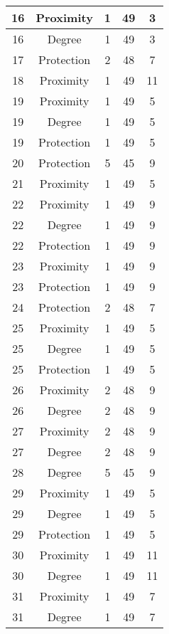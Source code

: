 \documentclass[results.tex]{subfiles}
\begin{document}
\begin{center}
\begin{tabular}{| c || c | c | c | c |}
    \hline
    16 & Proximity & 1 & 49 & 3 \\ 
    \hline
    16 & Degree & 1 & 49 & 3 \\ 
    \hline
    17 & Protection & 2 & 48 & 7 \\ 
    \hline
    18 & Proximity & 1 & 49 & 11 \\ 
    \hline
    19 & Proximity & 1 & 49 & 5 \\ 
    \hline
    19 & Degree & 1 & 49 & 5 \\ 
    \hline
    19 & Protection & 1 & 49 & 5 \\ 
    \hline
    20 & Protection & 5 & 45 & 9 \\ 
    \hline
    21 & Proximity & 1 & 49 & 5 \\ 
    \hline
    22 & Proximity & 1 & 49 & 9 \\ 
    \hline
    22 & Degree & 1 & 49 & 9 \\ 
    \hline
    22 & Protection & 1 & 49 & 9 \\ 
    \hline
    23 & Proximity & 1 & 49 & 9 \\ 
    \hline
    23 & Protection & 1 & 49 & 9 \\ 
    \hline
    24 & Protection & 2 & 48 & 7 \\ 
    \hline
    25 & Proximity & 1 & 49 & 5 \\ 
    \hline
    25 & Degree & 1 & 49 & 5 \\ 
    \hline
    25 & Protection & 1 & 49 & 5 \\ 
    \hline
    26 & Proximity & 2 & 48 & 9 \\ 
    \hline
    26 & Degree & 2 & 48 & 9 \\ 
    \hline
    27 & Proximity & 2 & 48 & 9 \\ 
    \hline
    27 & Degree & 2 & 48 & 9 \\ 
    \hline
    28 & Degree & 5 & 45 & 9 \\ 
    \hline
    29 & Proximity & 1 & 49 & 5 \\ 
    \hline
    29 & Degree & 1 & 49 & 5 \\ 
    \hline
    29 & Protection & 1 & 49 & 5 \\ 
    \hline
    30 & Proximity & 1 & 49 & 11 \\ 
    \hline
    30 & Degree & 1 & 49 & 11 \\ 
    \hline
    31 & Proximity & 1 & 49 & 7 \\ 
    \hline
    31 & Degree & 1 & 49 & 7 \\ 
    \hline

\end{tabular}
\end{center}
\end{document}
